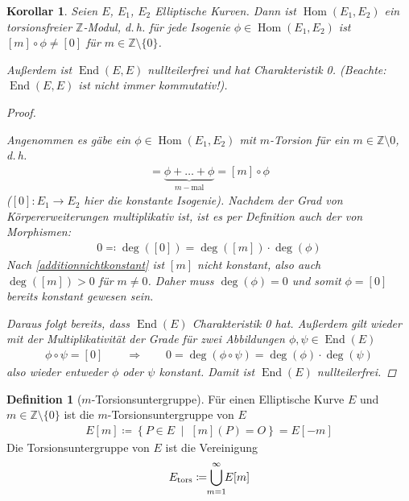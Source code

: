 \documentclass[english, german, parskip=half]{scrartcl}
\newtheorem{Korollar}[Satz]{Korollar}
\theoremstyle{definition}
\newtheorem{Definition}[Satz]{Definition}
\theoremstyle{remark}
\newcommand*{\Z}{\mathds{Z}}
\DeclareMathOperator{\Hom}{Hom} %
\DeclareMathOperator{\End}{End} %
\begin{document}
\begin{Korollar}
  Seien $E$, $E_1$, $E_2$ Elliptische Kurven. Dann ist $\Hom(E_1,E_2)$
  ein torsionsfreier $\Z$-Modul, d.\,h. für jede Isogenie
  $\phi\in\Hom(E_1,E_2)$ ist $[m]\circ\phi\neq[0]$ für
  $m\in\Z\setminus\{0\}$.

  Außerdem ist $\End(E,E)$ nullteilerfrei und hat Charakteristik 0.
  (Beachte: $\End(E,E)$ ist nicht immer kommutativ!).
  \begin{proof}
    \cite[siehe][Proposition 4.2 (b)]{silverman}
    
    Angenommen es gäbe ein $\phi\in\Hom(E_1,E_2)$ mit $m$-Torsion für
    ein $m\in\Z\setminus0$, d.\,h. 
    \begin{gather*}
      [0]
      =\underbrace{\phi+\dotsc+\phi}_{m-\text{mal}}
      = [m]\circ\phi
    \end{gather*}
    ($[0]\colon E_1\to E_2$ hier die konstante Isogenie).
    Nachdem der Grad von Körpererweiterungen multiplikativ ist, ist es
    per Definition auch der von Morphismen:
    \begin{gather*}
      0 \eqqcolon \deg([0]) = \deg([m])\cdot\deg(\phi)
    \end{gather*}
    Nach \autoref{additionnichtkonstant} ist $[m]$ nicht konstant,
    also auch $\deg([m])>0$ für $m\neq0$. Daher muss $\deg(\phi)=0$
    und somit $\phi=[0]$ bereits konstant gewesen sein.

    Daraus folgt bereits, dass $\End(E)$ Charakteristik 0 hat.
    Außerdem gilt wieder mit der Multiplikativität der Grade für zwei
    Abbildungen $\phi,\psi\in\End(E)$
    \begin{gather*}
      \phi\circ\psi=[0]
      \qquad\Rightarrow\qquad
      0 = \deg(\phi\circ\psi) = \deg(\phi)\cdot\deg(\psi)
    \end{gather*}
    also wieder entweder $\phi$ oder $\psi$ konstant.
    Damit ist $\End(E)$ nullteilerfrei.
  \end{proof}
\end{Korollar}

\begin{Definition}[$m$-Torsionsuntergruppe]
  Für einen Elliptische Kurve $E$ und $m\in\Z\setminus\{0\}$ ist die
  $m$-Torsionsuntergruppe von $E$
  \begin{gather*}
    E[m] \coloneqq \left\{ P\in E\;\middle|\; [m](P)=O\right\}
    = E[-m]
  \end{gather*}
  Die Torsionsuntergruppe von $E$ ist die Vereinigung
  \begin{gather*}
    E_\text{tors} \coloneqq \bigcup_{\mathclap{m=1}}^{\infty}E[m]
  \end{gather*}
\end{Definition}
\end{document}
